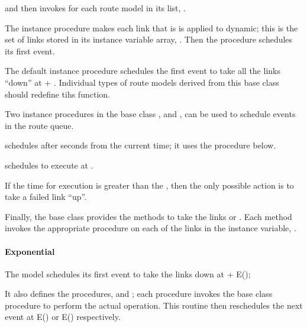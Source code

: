 and then invokes  for each route model in its list,
.
\begin{list}{}{}
\item The instance procedure
  makes each link that is is applied to dynamic;
  this is the set of links stored in its instance variable array,
  .
  Then the procedure schedules its first event.
\item The default instance procedure
  schedules the first event to take all the links ``down'' at
   + .
  Individual types of route models derived from this base class should
  redefine tihs function.
\item Two instance procedures in the base class ,
   and
  ,
  can be used to schedule events in the route queue.

   schedules 
  after  seconds from the current time; it uses the
  procedure  below.

   schedules 
  to execute at .

  If the time for execution is greater than the ,
  then the only possible action is to take a failed link ``up''.

\item  Finally, the base class provides the methods to take the links
   or
  .
  Each method invokes the appropriate procedure on each of the links
  in the instance variable, .
\end{list}

\paragraph{Exponential}
The model schedules its first event to take the links down
at  + E();

It also defines the procedures,  and ;
each procedure invokes the base class procedure to perform the actual operation.
This routine then reschedules the next event at
E() or E() respectively.

